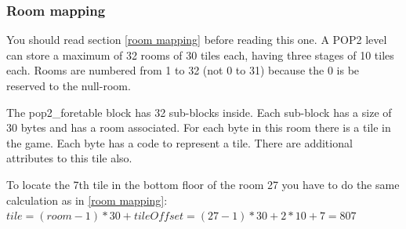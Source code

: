 \documentclass{article}
\begin{document}
\subsubsection{Room mapping \label{dat2 room mapping}} %
 You should read section \ref{room mapping} before reading this one.
 A POP2 level can store a maximum of 32 rooms of 30 tiles each, having 
 three stages of 10 tiles each. Rooms are numbered from 1 to 32 (not 0 to 
 31) because the 0 is be reserved to the null-room.

 The pop2\_foretable block has 32 sub-blocks inside. Each sub-block has a
 size of 30 bytes and has a room associated. For each byte in this room
 there is a tile in the game. Each byte has a code to represent a tile.
 There are additional attributes to this tile also.
 
 To locate the 7th tile in the bottom floor of the room 27 you have to do
 the same calculation as in \ref{room mapping}:
  $tile=(room-1)*30+tileOffset=(27-1)*30+2*10+7=807$
 
\end{document}
